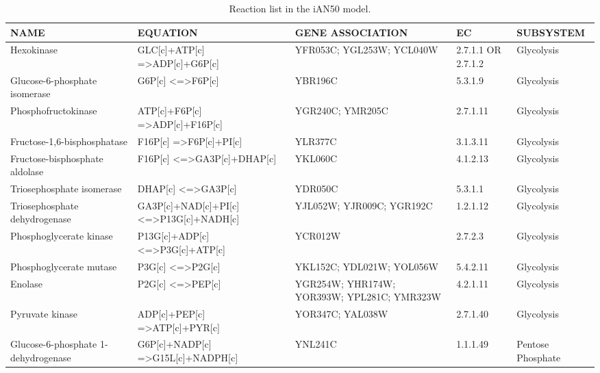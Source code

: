 {\tiny
\begin{landscape} %
\begin{longtable}{p{.20\linewidth} | p{.25\linewidth} | p{.19\linewidth} | p{.05\linewidth} | p{.10\linewidth}}
  \caption[Reaction list in the iAN50 model]{Reaction list in the iAN50 model.}\\
\hline
{NAME} & {EQUATION} & {GENE ASSOCIATION} & {EC} & {SUBSYSTEM} \\
\hline
\endfirsthead
\endhead %

Hexokinase & GLC{[}c{]}+ATP{[}c{]} =\textgreater ADP{[}c{]}+G6P{[}c{]}  & YFR053C; YGL253W; YCL040W  & 2.7.1.1 OR 2.7.1.2 & Glycolysis \\
Glucose-6-phosphate isomerase & G6P{[}c{]} \textless{}=\textgreater F6P{[}c{]}  & YBR196C & 5.3.1.9  & Glycolysis \\
Phosphofructokinase  & ATP{[}c{]}+F6P{[}c{]} =\textgreater ADP{[}c{]}+F16P{[}c{]} & YGR240C; YMR205C & 2.7.1.11 & Glycolysis \\
Fructose-1,6-bisphosphatase & F16P{[}c{]} =\textgreater F6P{[}c{]}+PI{[}c{]}  & YLR377C & 3.1.3.11 & Glycolysis \\
Fructose-bisphosphate aldolase  & F16P{[}c{]} \textless{}=\textgreater GA3P{[}c{]}+DHAP{[}c{]} & YKL060C & 4.1.2.13 & Glycolysis \\
Triosephosphate isomerase & DHAP{[}c{]} \textless{}=\textgreater GA3P{[}c{]}  & YDR050C & 5.3.1.1  & Glycolysis \\
Triosephosphate dehydrogenase & GA3P{[}c{]}+NAD{[}c{]}+PI{[}c{]} \textless{}=\textgreater P13G{[}c{]}+NADH{[}c{]} & YJL052W; YJR009C; YGR192C  & 1.2.1.12 & Glycolysis \\
Phosphoglycerate kinase  & P13G{[}c{]}+ADP{[}c{]} \textless{}=\textgreater P3G{[}c{]}+ATP{[}c{]}  & YCR012W & 2.7.2.3  & Glycolysis \\
Phosphoglycerate mutase  & P3G{[}c{]} \textless{}=\textgreater P2G{[}c{]}  & YKL152C; YDL021W; YOL056W  & 5.4.2.11 & Glycolysis \\
Enolase  & P2G{[}c{]} \textless{}=\textgreater PEP{[}c{]}  & YGR254W; YHR174W; YOR393W; YPL281C; YMR323W & 4.2.1.11 & Glycolysis \\
Pyruvate kinase  & ADP{[}c{]}+PEP{[}c{]} =\textgreater ATP{[}c{]}+PYR{[}c{]}  & YOR347C; YAL038W & 2.7.1.40 & Glycolysis \\
Glucose-6-phosphate 1-dehydrogenase & G6P{[}c{]}+NADP{[}c{]} =\textgreater G15L{[}c{]}+NADPH{[}c{]}  & YNL241C & 1.1.1.49 & Pentose Phosphate \\

\end{longtable}
\end{landscape}}
